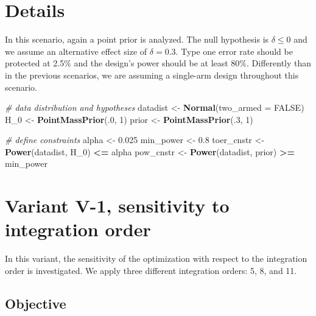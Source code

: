 \documentclass[]{book}
\newenvironment{Shaded}{\begin{snugshade}}{\end{snugshade}}
\newcommand{\CommentTok}[1]{\textcolor[rgb]{0.56,0.35,0.01}{\textit{#1}}}
\newcommand{\DataTypeTok}[1]{\textcolor[rgb]{0.13,0.29,0.53}{#1}}
\newcommand{\DecValTok}[1]{\textcolor[rgb]{0.00,0.00,0.81}{#1}}
\newcommand{\FloatTok}[1]{\textcolor[rgb]{0.00,0.00,0.81}{#1}}
\newcommand{\KeywordTok}[1]{\textcolor[rgb]{0.13,0.29,0.53}{\textbf{#1}}}
\newcommand{\NormalTok}[1]{#1}
\newcommand{\OperatorTok}[1]{\textcolor[rgb]{0.81,0.36,0.00}{\textbf{#1}}}
\newcommand{\OtherTok}[1]{\textcolor[rgb]{0.56,0.35,0.01}{#1}}
\newcommand{\StringTok}[1]{\textcolor[rgb]{0.31,0.60,0.02}{#1}}
\begin{document}
\hypertarget{details-4}{%
\section{Details}\label{details-4}}

In this scenario, again a point prior is analyzed.
The null hypothesis is \(\delta \leq 0\) and we assume an alternative effect size
of \(\delta = 0.3\).
Type one error rate should be protected at 2.5\% and the design's power should
be at least 80\%.
Differently than in the previous scenarios, we are assuming a single-arm
design throughout this scenario.

\begin{Shaded}
\begin{Highlighting}[]
\CommentTok{# data distribution and hypotheses}
\NormalTok{datadist   <-}\StringTok{ }\KeywordTok{Normal}\NormalTok{(}\DataTypeTok{two_armed =} \OtherTok{FALSE}\NormalTok{)}
\NormalTok{H_}\DecValTok{0}\NormalTok{        <-}\StringTok{ }\KeywordTok{PointMassPrior}\NormalTok{(.}\DecValTok{0}\NormalTok{, }\DecValTok{1}\NormalTok{)}
\NormalTok{prior      <-}\StringTok{ }\KeywordTok{PointMassPrior}\NormalTok{(.}\DecValTok{3}\NormalTok{, }\DecValTok{1}\NormalTok{)}

\CommentTok{# define constraints}
\NormalTok{alpha      <-}\StringTok{ }\FloatTok{0.025}
\NormalTok{min_power  <-}\StringTok{ }\FloatTok{0.8}
\NormalTok{toer_cnstr <-}\StringTok{ }\KeywordTok{Power}\NormalTok{(datadist, H_}\DecValTok{0}\NormalTok{)   }\OperatorTok{<=}\StringTok{ }\NormalTok{alpha}
\NormalTok{pow_cnstr  <-}\StringTok{ }\KeywordTok{Power}\NormalTok{(datadist, prior) }\OperatorTok{>=}\StringTok{ }\NormalTok{min_power}
\end{Highlighting}
\end{Shaded}

\hypertarget{variantV_1}{%
\section{Variant V-1, sensitivity to integration order}\label{variantV_1}}

In this variant, the sensitivity of the optimization with respect to the
integration order is investigated.
We apply three different integration orders: 5, 8, and 11.

\hypertarget{objective-10}{%
\subsection{Objective}\label{objective-10}}
\end{document}
